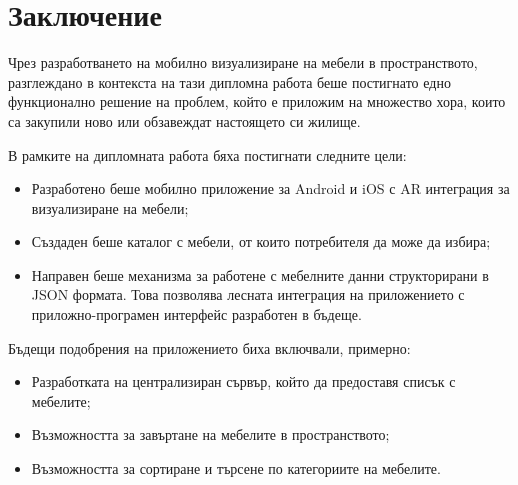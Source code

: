 \chapter*{Заключение}

Чрез разработването на мобилно визуализиране на мебели в пространството, разглеждано в контекста на тази дипломна работа беше постигнато едно функционално решение на проблем, който е приложим на множество хора, които са закупили ново или обзавеждат настоящето си жилище.

В рамките на дипломната работа бяха постигнати следните цели:
\begin{itemize}
    \item Разработено беше мобилно приложение за Android и iOS с AR интеграция за визуализиране на мебели;
    \item Създаден беше каталог с мебели, от които потребителя да може да избира;
    \item Направен беше механизма за работене с мебелните данни структорирани в JSON формата. Това позволява лесната интеграция на приложението с приложно-програмен интерфейс разработен в бъдеще.
\end{itemize}

Бъдещи подобрения на приложението биха включвали, примерно:
\begin{itemize}
    \item Разработката на централизиран сървър, който да предоставя списък с мебелите;
    \item Възможността за завъртане на мебелите в пространството;
    \item Възможността за сортиране и търсене по категориите на мебелите.
\end{itemize}